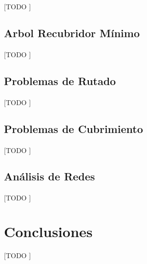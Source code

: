 \documentclass{subfiles}
\begin{document}
        \paragraph{}
        [TODO ]

      \subsection{Arbol Recubridor Mínimo}
      \label{sec:minimum_spanning_tree}

        \paragraph{}
        [TODO ]

      \subsection{Problemas de Rutado}
      \label{sec:network_routing}

        \paragraph{}
        [TODO ]

      \subsection{Problemas de Cubrimiento}
      \label{sec:network_covering}

        \paragraph{}
        [TODO ]

      \subsection{Análisis de Redes}
      \label{sec:network_analysis}

        \paragraph{}
        [TODO ]

    \section{Conclusiones}
    \label{sec:graphs_conclusions}

      \paragraph{}
      [TODO ]
\end{document}

